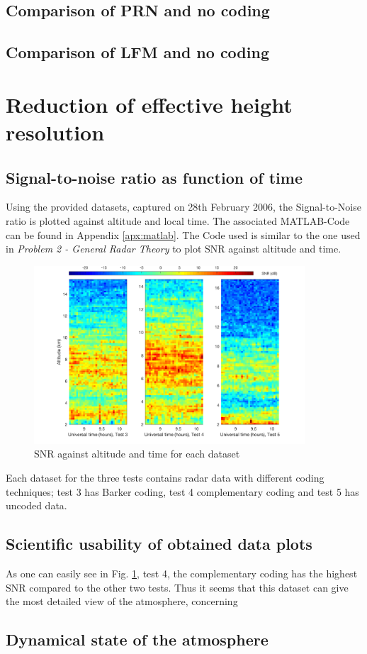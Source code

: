 \subsection{Comparison of PRN and no coding}

\subsection{Comparison of LFM and no coding}


\section{Reduction of effective height resolution}

\subsection{Signal-to-noise ratio as function of time}
Using the provided datasets, captured on 28th February 2006, the Signal-to-Noise ratio is plotted against altitude and local time. The associated MATLAB-Code can be found in Appendix \ref{apx:matlab}. The Code used is similar to the one used in \textit{Problem 2 - General Radar Theory} to plot SNR against altitude and time.

\begin{figure}
	\centering
	\includegraphics[width=0.9\textwidth]{images/task2_snr_plot}
	\caption{SNR against altitude and time for each dataset}
	\label{fig:snr}
\end{figure}

Each dataset for the three tests contains radar data with different coding techniques; test 3 has Barker coding, test 4 complementary coding and test 5 has uncoded data. \newline



\subsection{Scientific usability of obtained data plots}
As one can easily see in Fig. \ref{fig:snr}, test 4, the complementary coding has the highest SNR compared to the other two tests. Thus it seems that this dataset can give the most detailed view of the atmosphere, concerning
\subsection{Dynamical state of the atmosphere}
